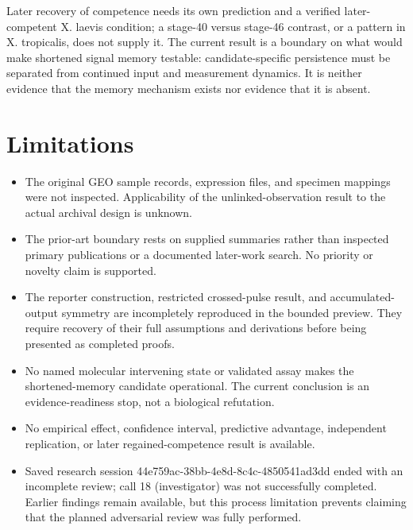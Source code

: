 \documentclass[11pt]{article}
\begin{document}
Later recovery of competence needs its own prediction and a verified later-competent X. laevis condition; a stage-40 versus stage-46 contrast, or a pattern in X. tropicalis, does not supply it. The current result is a boundary on what would make shortened signal memory testable: candidate-specific persistence must be separated from continued input and measurement dynamics. It is neither evidence that the memory mechanism exists nor evidence that it is absent.

\section{Limitations}
\begin{itemize}
\item The original GEO sample records, expression files, and specimen mappings were not inspected. Applicability of the unlinked-observation result to the actual archival design is unknown.
\item The prior-art boundary rests on supplied summaries rather than inspected primary publications or a documented later-work search. No priority or novelty claim is supported.
\item The reporter construction, restricted crossed-pulse result, and accumulated-output symmetry are incompletely reproduced in the bounded preview. They require recovery of their full assumptions and derivations before being presented as completed proofs.
\item No named molecular intervening state or validated assay makes the shortened-memory candidate operational. The current conclusion is an evidence-readiness stop, not a biological refutation.
\item No empirical effect, confidence interval, predictive advantage, independent replication, or later regained-competence result is available.
\item Saved research session 44e759ac-38bb-4e8d-8c4c-4850541ad3dd ended with an incomplete review; call 18 (investigator) was not successfully completed. Earlier findings remain available, but this process limitation prevents claiming that the planned adversarial review was fully performed.
\end{itemize}
\end{document}
